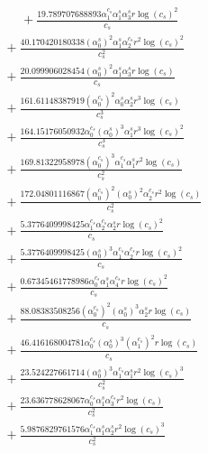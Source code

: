 \documentclass[10pt]{article}
\begin{document}
\begin{align*}
\phantom{R_{3,9}} &\phantom{={}}{}  + \frac{19.789707688893 \alpha_{1}^{c_s} \alpha_{1}^s \alpha_{3}^s r \log{\left(c_{s} \right)}^{2}}{c_{s}} \\
&{}  + \frac{40.170420180338 \left(\alpha_{0}^s\right)^{2} \alpha_{1}^s \alpha_{2}^{c_s} r^{2} \log{\left(c_{s} \right)}^{2}}{c_{s}^{2}} \\
&{}  + \frac{20.099906028454 \left(\alpha_{0}^s\right)^{2} \alpha_{1}^s \alpha_{3}^s r \log{\left(c_{s} \right)}}{c_{s}} \\
&{}  + \frac{161.61148387919 \left(\alpha_{0}^{c_s}\right)^{2} \alpha_{0}^s \alpha_{2}^s r^{3} \log{\left(c_{s} \right)}}{c_{s}^{3}} \\
&{}  + \frac{164.15176050932 \alpha_{0}^{c_s} \left(\alpha_{0}^s\right)^{3} \alpha_{1}^s r^{3} \log{\left(c_{s} \right)}^{2}}{c_{s}^{3}} \\
&{}  + \frac{169.81322958978 \left(\alpha_{0}^{c_s}\right)^{3} \alpha_{1}^{c_s} \alpha_{1}^s r^{2} \log{\left(c_{s} \right)}}{c_{s}^{2}} \\
&{}  + \frac{172.04801116867 \left(\alpha_{0}^{c_s}\right)^{2} \left(\alpha_{0}^s\right)^{2} \alpha_{2}^{c_s} r^{2} \log{\left(c_{s} \right)}}{c_{s}^{2}} \\
&{}  + \frac{5.3776409998425 \alpha_{1}^{c_s} \alpha_{2}^{c_s} \alpha_{2}^s r \log{\left(c_{s} \right)}^{2}}{c_{s}} \\
&{}  + \frac{5.3776409998425 \left(\alpha_{0}^s\right)^{3} \alpha_{1}^{c_s} \alpha_{2}^{c_s} r \log{\left(c_{s} \right)}^{2}}{c_{s}} \\
&{}  + \frac{0.67345461778986 \alpha_{0}^{c_s} \alpha_{1}^s \alpha_{4}^{c_s} r \log{\left(c_{s} \right)}^{2}}{c_{s}} \\
&{}  + \frac{88.08383508256 \left(\alpha_{0}^{c_s}\right)^{2} \left(\alpha_{0}^s\right)^{3} \alpha_{2}^s r \log{\left(c_{s} \right)}}{c_{s}} \\
&{}  + \frac{46.416168004781 \alpha_{0}^{c_s} \left(\alpha_{0}^s\right)^{3} \left(\alpha_{1}^{c_s}\right)^{2} r \log{\left(c_{s} \right)}}{c_{s}} \\
&{}  + \frac{23.524227661714 \left(\alpha_{0}^s\right)^{3} \alpha_{1}^{c_s} \alpha_{1}^s r^{2} \log{\left(c_{s} \right)}^{3}}{c_{s}^{2}} \\
&{}  + \frac{23.636778628067 \alpha_{0}^{c_s} \alpha_{1}^s \alpha_{3}^{c_s} r^{2} \log{\left(c_{s} \right)}}{c_{s}^{2}} \\
&{}  + \frac{5.9876829761576 \alpha_{1}^{c_s} \alpha_{1}^s \alpha_{2}^s r^{2} \log{\left(c_{s} \right)}^{3}}{c_{s}^{2}} \\

\end{align*}
\end{document}
